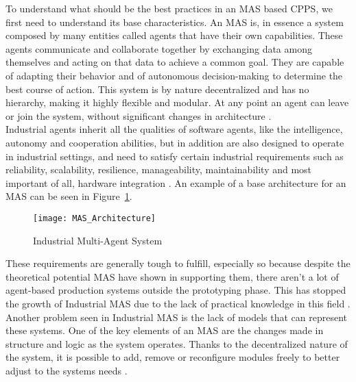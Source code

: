 
To understand what should be the best practices in an \gls{MAS} based \gls{CPPS}, we first need to understand its base characteristics. An \Gls{MAS} is, in essence a system composed by many entities called agents that have their own capabilities. These agents communicate and collaborate together by exchanging data among themselves and acting on that data to achieve a common goal. They are capable of adapting their behavior and of autonomous decision-making to determine the best course of action. This system is by nature decentralized and has no hierarchy, making it highly flexible and modular. At any point an agent can leave or join the system, without significant changes in architecture \cite{paulo02}.\\

Industrial agents inherit all the qualities of software agents, like the intelligence, autonomy and cooperation abilities, but in addition are also designed to operate in industrial settings, and need to satisfy certain industrial requirements such as reliability, scalability, resilience, manageability, maintainability and most important of all, hardware integration \cite{Leitao2021}. An example of a base architecture for an \gls{MAS} can be seen in Figure~\ref{fig:MAS_Architecture}. \\

\begin{figure}[h!]
	\centering
	\texttt{[image: MAS\_Architecture]}
	\caption{Industrial Multi-Agent System}
	\label{fig:MAS_Architecture}
\end{figure}

These requirements are generally tough to fulfill, especially so because despite the theoretical potential \gls{MAS} have shown in supporting them, there aren't a lot of agent-based production systems outside the prototyping phase. This has stopped the growth of Industrial \gls{MAS} due to the lack of practical knowledge in this field \cite{Karnouskos2019}. Another problem seen in Industrial \gls{MAS} is the lack of models that can represent these systems. One of the key elements of an \gls{MAS} are the changes made in structure and logic as the system operates. Thanks to the decentralized nature of the system, it is possible to add, remove or reconfigure modules freely to better adjust to the systems needs \cite{Karnouskos2019}.\\

